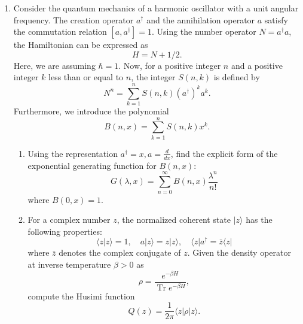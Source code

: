 \documentclass{article}
\begin{document}
\begin{enumerate}[label=\fbox{\arabic*}]
  \item Consider the quantum mechanics of a harmonic oscillator with a unit angular frequency. The creation operator $a^\dagger$ and the annihilation operator $a$ satisfy the commutation relation $[a, a^\dagger] = 1$. Using the number operator $N = a^\dagger a$, the Hamiltonian can be expressed as
        \[
          H = N + 1/2.
        \]
        Here, we are assuming $\hbar = 1$. Now, for a positive integer $n$ and a positive integer $k$ less than or equal to $n$, the integer $S(n, k)$ is defined by
        \[
          N^n = \sum_{k=1}^n S(n, k) (a^\dagger)^k a^k.
        \]
        Furthermore, we introduce the polynomial
        \[
          B(n, x) = \sum_{k=1}^n S(n, k) x^k.
        \]
        \begin{enumerate}[label=(\roman*)]
          \item Using the representation $a^\dagger = x, a = \frac{d}{dx}$, find the explicit form of the exponential generating function for $B(n, x)$:
                \[
                  G(\lambda, x) = \sum_{n=0}^\infty B(n, x) \frac{\lambda^n}{n!}
                \]
                where $B(0, x) = 1$.
          \item For a complex number $z$, the normalized coherent state $|z\rangle$ has the following properties:
                \[
                  \langle z | z \rangle = 1, \quad a | z \rangle = z | z \rangle, \quad \langle z | a^\dagger = \bar{z} \langle z |
                \]
                where $\bar{z}$ denotes the complex conjugate of $z$. Given the density operator at inverse temperature $\beta > 0$ as
                \[
                  \rho = \frac{e^{-\beta H}}{\operatorname{Tr} e^{-\beta H}},
                \]
                compute the Husimi function
                \[
                  Q(z) = \frac{1}{2\pi} \langle z | \rho | z \rangle.
                \]
        \end{enumerate}
\end{enumerate}

\newpage
\end{document}
